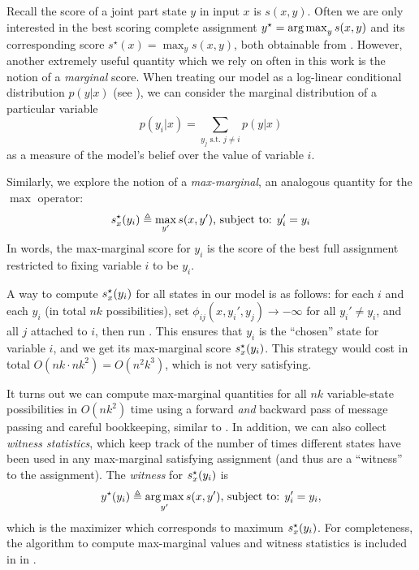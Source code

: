 Recall the score  of a joint part state $y$ in input $x$ is $s(x,y)$. Often we
are only interested in the best scoring complete assignment $y^\star = 
\mathop{\arg\max}_y s(x,y)$ and its corresponding score $s^\star(x) = \max_y s(x,y)$, 
both obtainable from .  However, another extremely useful 
quantity which we rely on often in this work is the notion of a {\em marginal} 
score.  When treating our model as a log-linear conditional distribution 
$p(y|x)$ (see ), we can consider the marginal distribution 
of a particular variable
\begin{equation}
p(y_i|x) = \sum_{y_j \text{ s.t. } j \neq i} p(y|x)
\end{equation}
as a measure of the model's belief over the value of variable $i$.  

Similarly, we explore the notion of a {\em max-marginal}, an analogous quantity 
for the $\max$ operator:
\begin{align}
s^\star_x(y_i) \triangleq  \max_{y'} s(x,y') \text{, subject to: } y_i' = y_i
 \end{align}
In words, the max-marginal score for $y_i$ is the score of the best full 
assignment restricted to fixing variable $i$ to be $y_i$. 

A \naive way to compute $s^\star_x(y_i)$ for all states in our model is as follows: for 
each $i$ and each $y_i$ (in total $nk$ possibilities), set 
$\phi_{ij}(x,y_i',y_j) \rightarrow -\infty$ for all $y_i' \neq y_i$, and all 
$j$ attached to $i$, then run .  This ensures that $y_i$ 
is the ``chosen'' state for variable $i$, and we get its max-marginal score 
$s^\star_x(y_i)$.  This strategy would cost in total $O(nk \cdot nk^2) = O(n^2k^3)$, 
which is not very satisfying.

It turns out we can compute max-marginal quantities for all $nk$ variable-state 
possibilities in $O(nk^2)$ time using a forward {\em and } backward pass of 
message passing and careful bookkeeping, similar to .  In 
addition, we can also collect {\em witness statistics}, which keep track of the 
number of times different states have been used in any max-marginal satisfying 
assignment (and thus are a ``witness'' to the assignment).  The {\em witness} 
for $s^\star_x(y_i)$ is 
\begin{equation}
y^\star(y_i) \triangleq  \mathop{\arg\max}_{y'} s(x,y') \text{, subject to: } y_i' = y_i,
\end{equation}
which is the maximizer which corresponds to maximum $s^\star_x(y_i)$.  For completeness, the algorithm to compute max-marginal values and witness statistics is included in \secref{} in .

